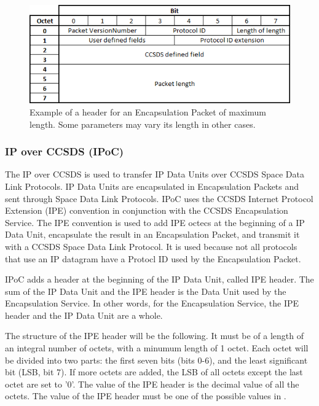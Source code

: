 \begin{figure}[H]
\begin{center}
\includegraphics[scale=1]{ES_header.PNG}
\caption[Encapsulation header]{Example of a header for an Encapsulation Packet of maximum length. Some parameters may vary its length in other cases.}
\label{fig:ESheader}
\end{center}
\end{figure}

\subsubsection*{IP over CCSDS (IPoC)\cite{IPoC}}
The IP over CCSDS is used to transfer IP Data Units over CCSDS Space Data Link Protocols. IP Data Units are encapsulated in Encapsulation Packets and sent through Space Data Link Protocols. IPoC uses the CCSDS Internet Protocol Extension (IPE) convention in conjunction with the CCSDS Encapsulation Service. The IPE convention is used to add IPE octecs at the beginning of a IP Data Unit, encapsulate the result in an Encapsulation Packet, and transmit it with a CCSDS Space Data Link Protocol. It is used because not all protocols that use an IP datagram have a Protocl ID used by the Encapsulation Packet.

IPoC adds a header at the beginning of the IP Data Unit, called IPE header. The sum of the IP Data Unit and the IPE header is the Data Unit used by the Encapsulation Service. In other words, for the Encapsulation Service, the IPE header and the IP Data Unit are a whole.

The structure of the IPE header will be the following. It must be of a length of an integral number of octets, with a minumum length of 1 octet. Each octet will be divided into two parts: the first seven bits (bits 0-6), and the least significant bit (LSB, bit 7). If more octets are added, the LSB of all octets except the last octet are set to '0'. The value of the IPE header is the decimal value of all the octets. The value of the IPE header must be one of the possible values in \cite{SANAIPE}.

